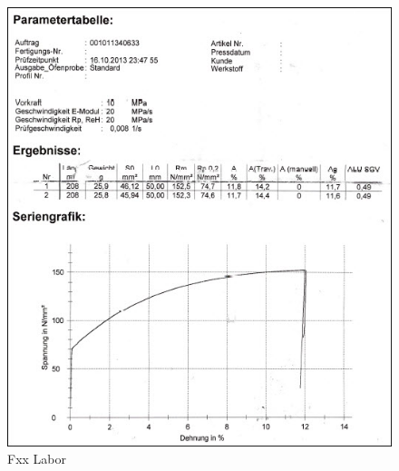 \documentclass[12pt,a4paper,parskip]{scrartcl}
\begin{document}
\begin{figure}[hbtp]
\centering
\includegraphics[width=1\textwidth]{FxxLabor.jpg}
\caption{Fxx Labor}
\end{figure}
\end{document}
